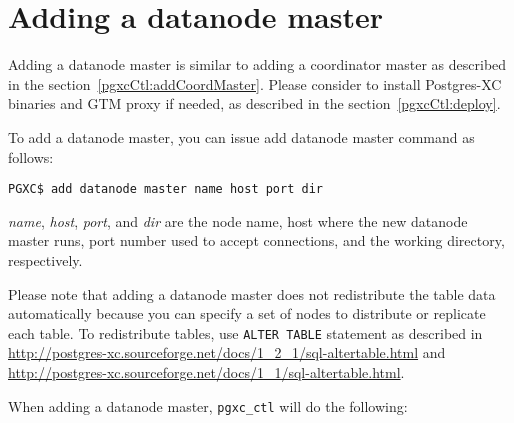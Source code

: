 
\section{Adding a datanode master}

  Adding a datanode master is similar to adding a coordinator master as described in the
  section~\ref{pgxcCtl:addCoordMaster}.
  Please consider to install Postgres-XC binaries and GTM proxy if needed, as described in
  the section~\ref{pgxcCtl:deploy}.
  
  To add a datanode master, you can issue add datanode master command as follows:
  
  \begin{lstlisting}[frame=single]
PGXC$ add datanode master name host port dir
  \end{lstlisting}
  
  {\it name}, {\it host}, {\it port}, and {\it dir} are the node name, host where the new
  datanode master runs, port number used to accept connections, and the working directory,
  respectively.
  
  Please note that adding a datanode master does not redistribute the table data automatically
  because you can specify a set of nodes to distribute or replicate each table.
  To redistribute tables, use \verb|ALTER TABLE| statement
  as described in \url{http://postgres-xc.sourceforge.net/docs/1\_2\_1/sql-altertable.html}
  and \url{http://postgres-xc.sourceforge.net/docs/1\_1/sql-altertable.html}.
  
  When adding a datanode master, \verb|pgxc_ctl| will do the following:
  
